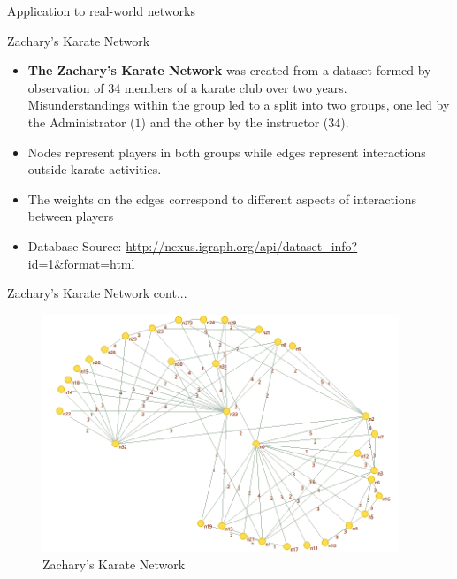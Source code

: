 \documentclass{beamer}
\begin{document}
\begin{frame}{Application to real-world networks}
	\begin{block}{Zachary's Karate Network}
		\begin{itemize}
		\item \textbf{The Zachary's Karate Network} was created from a dataset formed by observation of $34$ members of a karate club over two years. Misunderstandings within the group led to a split into two groups, one led by the Administrator ($1$) and the other by the instructor ($34$).
		\vspace{0.2cm}
		\item Nodes represent players in both groups while edges represent interactions outside karate activities.
		\vspace{0.2cm}
		\item The weights on the edges correspond to different aspects of interactions between players
		
		\vspace{0.2cm}
		\item Database Source:
		 \url{http://nexus.igraph.org/api/dataset_info?id=1&format=html}
		
		\end{itemize}
		
	\end{block}
\end{frame}

\begin{frame}{Zachary's Karate Network cont...}
	\begin{figure}[!h]
		\centering
			\includegraphics[width=0.95\textwidth]{images/zachvisual.png}
			\caption{Zachary's Karate Network}
	\end{figure}
\end{frame}
\end{document}

